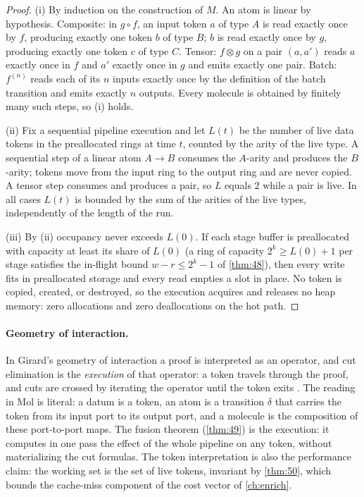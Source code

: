 \begin{proof}
(i) By induction on the construction of $M$. An atom is linear by hypothesis. Composite: in $g \circ f$, an input token $a$ of type $A$ is read exactly once by $f$, producing exactly one token $b$ of type $B$; $b$ is read exactly once by $g$, producing exactly one token $c$ of type $C$. Tensor: $f \otimes g$ on a pair $(a, a')$ reads $a$ exactly once in $f$ and $a'$ exactly once in $g$ and emits exactly one pair. Batch: $f^{(n)}$ reads each of its $n$ inputs exactly once by the definition of the batch transition and emits exactly $n$ outputs. Every molecule is obtained by finitely many such steps, so (i) holds.

(ii) Fix a sequential pipeline execution and let $L (t)$ be the number of live data tokens in the preallocated rings at time $t$, counted by the arity of the live type. A sequential step of a linear atom $A \to B$ consumes the $A$-arity and produces the $B$-arity; tokens move from the input ring to the output ring and are never copied. A tensor step consumes and produces a pair, so $L$ equals $2$ while a pair is live. In all cases $L (t)$ is bounded by the sum of the arities of the live types, independently of the length of the run.

(iii) By (ii) occupancy never exceeds $L (0)$. If each stage buffer is preallocated with capacity at least its share of $L (0)$ (a ring of capacity $2^k \geq L (0) + 1$ per stage satisfies the in-flight bound $w - r \leq 2^k - 1$ of \autoref{thm:48}), then every write fits in preallocated storage and every read empties a slot in place. No token is copied, created, or destroyed, so the execution acquires and releases no heap memory: zero allocations and zero deallocations on the hot path.
\end{proof}

\paragraph{Geometry of interaction.}
In Girard's geometry of interaction a proof is interpreted as an operator, and cut elimination is the \emph{execution} of that operator: a token travels through the proof, and cuts are crossed by iterating the operator until the token exits \citep{girard, arxiv-linear-logic-goi}. The reading in Mol is literal: a datum is a token, an atom is a transition $\delta$ that carries the token from its input port to its output port, and a molecule is the composition of these port-to-port maps. The fusion theorem (\autoref{thm:49}) is the execution: it computes in one pass the effect of the whole pipeline on any token, without materializing the cut formulas. The token interpretation is also the performance claim: the working set is the set of live tokens, invariant by \autoref{thm:50}, which bounds the cache-miss component of the cost vector of \autoref{ch:enrich}.

